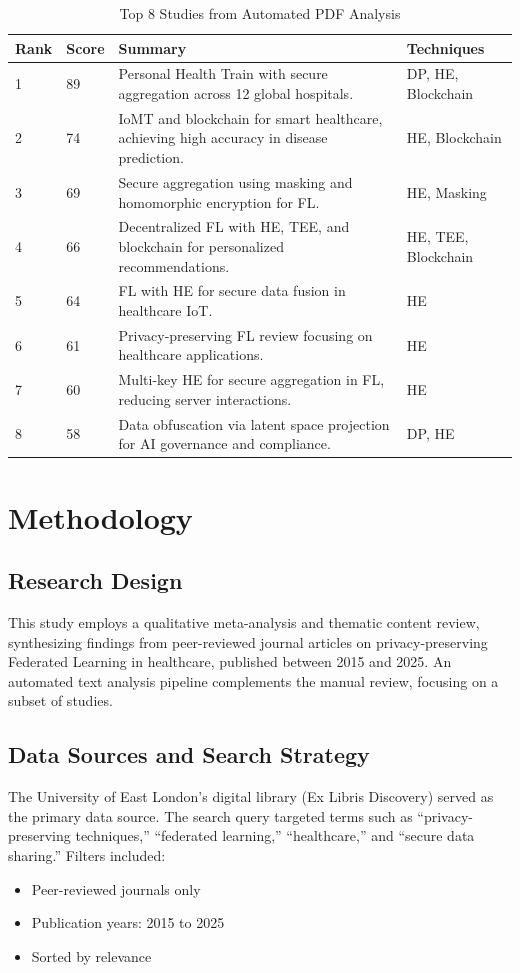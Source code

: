 \documentclass[12pt]{report}
\begin{document}
\begin{table}[h]
    \centering
    \begin{tabular}{|p{1.5cm}|p{2cm}|p{8cm}|p{2cm}|}
        \hline
        \textbf{Rank} & \textbf{Score} & \textbf{Summary} & \textbf{Techniques} \\
        \hline
        1 & 89 & Personal Health Train with secure aggregation across 12 global hospitals. & DP, HE, Blockchain \\
        2 & 74 & IoMT and blockchain for smart healthcare, achieving high accuracy in disease prediction. & HE, Blockchain \\
        3 & 69 & Secure aggregation using masking and homomorphic encryption for FL. & HE, Masking \\
        4 & 66 & Decentralized FL with HE, TEE, and blockchain for personalized recommendations. & HE, TEE, Blockchain \\
        5 & 64 & FL with HE for secure data fusion in healthcare IoT. & HE \\
        6 & 61 & Privacy-preserving FL review focusing on healthcare applications. & HE \\
        7 & 60 & Multi-key HE for secure aggregation in FL, reducing server interactions. & HE \\
        8 & 58 & Data obfuscation via latent space projection for AI governance and compliance. & DP, HE \\
        \hline
    \end{tabular}
    \caption{Top 8 Studies from Automated PDF Analysis}
    \label{tab:script_results}
\end{table}

\chapter{Methodology}

\section{Research Design}
This study employs a qualitative meta-analysis and thematic content review, synthesizing findings from peer-reviewed journal articles on privacy-preserving Federated Learning in healthcare, published between 2015 and 2025. An automated text analysis pipeline complements the manual review, focusing on a subset of studies.

\section{Data Sources and Search Strategy}
The University of East London’s digital library (Ex Libris Discovery) served as the primary data source. The search query targeted terms such as ``privacy-preserving techniques,'' ``federated learning,'' ``healthcare,'' and ``secure data sharing.'' Filters included:
\begin{itemize}
    \item Peer-reviewed journals only
    \item Publication years: 2015 to 2025
    \item Sorted by relevance
\end{itemize}
\end{document}
